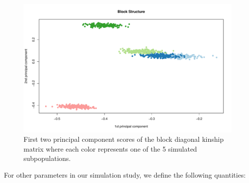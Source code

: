 \documentclass[12pt,letter]{article}\usepackage[]{graphicx}\usepackage[]{color}
\newenvironment{knitrout}{}{} %
\begin{document}
\begin{knitrout}\scriptsize
{}\color{fgcolor}\begin{figure}[H]

{\centering \includegraphics[width=1\linewidth]{figure/plot-pc-sim-1} 

}

\caption[First two principal component scores of the block diagonal kinship matrix where each color represents one of the 5 simulated subpopulations]{First two principal component scores of the block diagonal kinship matrix where each color represents one of the 5 simulated subpopulations.}\label{fig:plot-pc-sim}
\end{figure}


\end{knitrout}


For other parameters in our simulation study, we define the following quantities:
\end{document}

